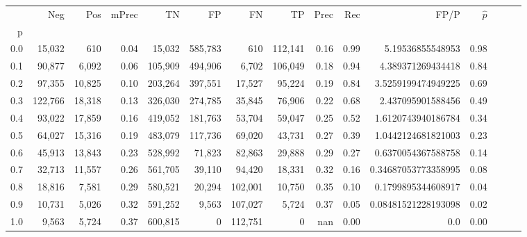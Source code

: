 \begin{tabular}{rrrrrrrrrrrrrrr}
\toprule
{} &      Neg &     Pos & mPrec &       TN &       FP &       FN &       TP &  Prec &   Rec &                 FP/P & $\hat{p}$ \\
p   &          &         &       &          &          &          &          &       &       &                      &           \\
\midrule
0.0 &   15,032 &     610 &  0.04 &   15,032 &  585,783 &      610 &  112,141 &  0.16 &  0.99 &     5.19536855548953 &      0.98 \\
0.1 &   90,877 &   6,092 &  0.06 &  105,909 &  494,906 &    6,702 &  106,049 &  0.18 &  0.94 &    4.389371269434418 &      0.84 \\
0.2 &   97,355 &  10,825 &  0.10 &  203,264 &  397,551 &   17,527 &   95,224 &  0.19 &  0.84 &   3.5259199474949225 &      0.69 \\
0.3 &  122,766 &  18,318 &  0.13 &  326,030 &  274,785 &   35,845 &   76,906 &  0.22 &  0.68 &    2.437095901588456 &      0.49 \\
0.4 &   93,022 &  17,859 &  0.16 &  419,052 &  181,763 &   53,704 &   59,047 &  0.25 &  0.52 &   1.6120743940186784 &      0.34 \\
0.5 &   64,027 &  15,316 &  0.19 &  483,079 &  117,736 &   69,020 &   43,731 &  0.27 &  0.39 &   1.0442124681821003 &      0.23 \\
0.6 &   45,913 &  13,843 &  0.23 &  528,992 &   71,823 &   82,863 &   29,888 &  0.29 &  0.27 &   0.6370054367588758 &      0.14 \\
0.7 &   32,713 &  11,557 &  0.26 &  561,705 &   39,110 &   94,420 &   18,331 &  0.32 &  0.16 &  0.34687053773358995 &      0.08 \\
0.8 &   18,816 &   7,581 &  0.29 &  580,521 &   20,294 &  102,001 &   10,750 &  0.35 &  0.10 &   0.1799895344608917 &      0.04 \\
0.9 &   10,731 &   5,026 &  0.32 &  591,252 &    9,563 &  107,027 &    5,724 &  0.37 &  0.05 &  0.08481521228193098 &      0.02 \\
1.0 &    9,563 &   5,724 &  0.37 &  600,815 &        0 &  112,751 &        0 &   nan &  0.00 &                  0.0 &      0.00 \\
\bottomrule
\end{tabular}
